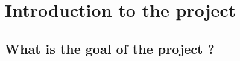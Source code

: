 \chapter{Introduction to the project}\label{text:01_intro}

\begin{comment}
	This section will include :
		- Why this program was created
		- What problems does it tackle / what are its features (very quickly)
		- How to read this manual ?
		- A few definitions
			- notably, the use of certain terms (dataset = 1/multiple 3D image(s))
\end{comment}

\section{What is the goal of the project ?}\label{text:01_intro:00_project}
